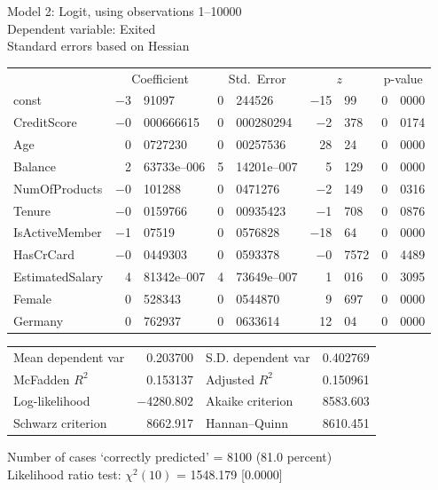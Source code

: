 \documentclass[11pt]{article}
\begin{document}
\thispagestyle{empty}

\begin{center}

Model 2: Logit, using observations 1--10000\\
Dependent variable: Exited\\
Standard errors based on Hessian

\vspace{1em}

\begin{tabular}{lr@{.}lr@{.}lr@{.}lr@{.}l}
  &
 \multicolumn{2}{c}{Coefficient} &
  \multicolumn{2}{c}{Std.\ Error} &
   \multicolumn{2}{c}{$z$} &
    \multicolumn{2}{c}{p-value} \\[1ex]
const &
  $-$3&91097 &
    0&244526 &
      $-$15&99 &
        0&0000 \\
CreditScore &
  $-$0&000666615 &
    0&000280294 &
      $-$2&378 &
        0&0174 \\
Age &
  0&0727230 &
    0&00257536 &
      28&24 &
        0&0000 \\
Balance &
  2&63733\textrm{e--006} &
    5&14201\textrm{e--007} &
      5&129 &
        0&0000 \\
NumOfProducts &
  $-$0&101288 &
    0&0471276 &
      $-$2&149 &
        0&0316 \\
Tenure &
  $-$0&0159766 &
    0&00935423 &
      $-$1&708 &
        0&0876 \\
IsActiveMember &
  $-$1&07519 &
    0&0576828 &
      $-$18&64 &
        0&0000 \\
HasCrCard &
  $-$0&0449303 &
    0&0593378 &
      $-$0&7572 &
        0&4489 \\
EstimatedSalary &
  4&81342\textrm{e--007} &
    4&73649\textrm{e--007} &
      1&016 &
        0&3095 \\
Female &
  0&528343 &
    0&0544870 &
      9&697 &
        0&0000 \\
Germany &
  0&762937 &
    0&0633614 &
      12&04 &
        0&0000 \\
\end{tabular}

\vspace{1ex}
\begin{tabular}{lrlr}
Mean dependent var &  0.203700 & S.D. dependent var &  0.402769 \\
McFadden $R^2$ &  0.153137 & Adjusted $R^2$ &  0.150961 \\
Log-likelihood & $-$4280.802 & Akaike criterion &  8583.603 \\
Schwarz criterion &  8662.917 & Hannan--Quinn &  8610.451 \\
\end{tabular}


\vspace{1ex}
\vspace{1em}
\begin{raggedright}
Number of cases `correctly predicted' = 8100 (81.0 percent)\\
Likelihood ratio test: $\chi^2(10)$ = 1548.179 [0.0000]\\
\end{raggedright}

\end{center}
\end{document}
